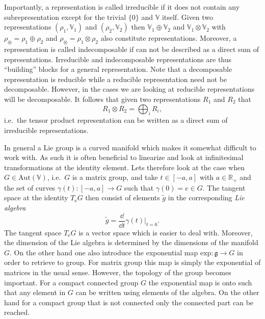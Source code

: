 Importantly, a representation is called irreducible if it does not contain any subrepresentation except for the trivial $\{0\}$ and $\mathbb{V}$ itself. Given two representations $(\rho_1,\mathbb{V}_1)$ and $(\rho_2,\mathbb{V}_2)$ then $\mathbb{V}_1\oplus\mathbb{V}_2$ and $\mathbb{V}_1\otimes\mathbb{V}_2$ with $\rho_\oplus = \rho_1\oplus\rho_2$ and $\rho_\otimes = \rho_1\otimes\rho_2$ also constitute representations. Moreover, a representation is called indecomposable if can not be described as a direct sum of representations. Irreducible and indecomposable representations are thus ``building'' blocks for a general representation. Note that a decomposable representation is reducible while a reducible representation need not be decomposable. However, in the cases we are looking at reducible representations will be decomposable. It follows that given two representations $R_1$ and $R_2$ that 
\begin{equation}
    R_1\otimes R_2 = \bigoplus_i R_i,
\end{equation}
i.e.\ the tensor product representation can be written as a direct sum of irreducible representations.


In general a Lie group is a curved manifold which makes it somewhat difficult to work with. As such it is often beneficial to linearize and look at infinitesimal transformations at the identity element. Lets therefore look at the case when $G\in \text{Aut}(\mathbb{V})$, i.e.\ $G$ is a matrix group, and take $t\in [-a,a]$ with $a\in\mathbb{R_+}$ and the set of curves $\gamma(t): [-a,a]\to G$ such that $\gamma(0)= e\in G$. The tangent space at the identity $T_\mathrm{e}G$ then consist of elements $\tilde{g}$ in the corresponding \emph{Lie algebra}
\begin{equation}
\tilde{g} = \frac{\dd}{\dd t}\gamma(t)|_{t=0}.
\end{equation}
The tangent space $T_\mathrm{e}G$ is a vector space which is easier to deal with. Moreover, the dimension of the Lie algebra is determined by the dimensions of the manifold $G$. On the other hand one also introduce the exponential map $\text{exp}: \mathfrak{g}\to G$ in order to retrieve to group. For matrix group this map is simply the exponential of matrices in the usual sense. However, the topology of the group becomes important. For a compact connected group $G$ the exponential map is onto such that any element in $G$ can be written using elements of the algebra. On the other hand for a compact group that is not connected only the connected part can be reached. 

